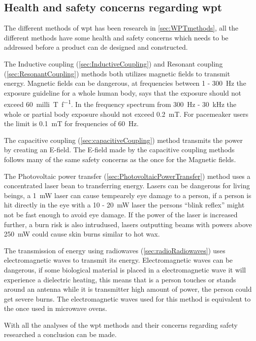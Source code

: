 \subsection{Health and safety concerns regarding \gls{wpt}}

The different methods of \gls{wpt} has been research in \autoref{sec:WPTmethods}, all the different methods have some health and safety concerns which needs to be addressed before a product can de designed and constructed. 

The Inductive coupling (\autoref{sec:InductiveCoupling}) and Resonant coupling (\autoref{sec:ResonantCoupling}) methods both utilizes magnetic fields to transmit energy. Magnetic fields can be dangerous, at frequencies between 1 - \SI{300}{\hertz} the exposure guideline for a whole human body, says that the exposure should not exceed \SI{60}{milli\tesla\per f}. In the frequency spectrum from \SI{300}{\hertz} - \SI{30}{\kilo\hertz} the whole or partial body exposure should not exceed \SI{0.2}{\milli\tesla}. For pacemeaker users the limit is \SI{0.1}{\milli\tesla} for frequencies of \SI{60}{\hertz}.  \cite{web:MagneticFieldSafty} 

The capacitive coupling (\autoref{sec:capacitiveCoupling}) method transmits the power by creating an E-field. The E-field made by the capacitive coupling methods follows many of the same safety concerns as the once for the Magnetic fields. 

The Photovoltaic power transfer (\autoref{sec:PhotovoltaicPowerTransfer}) method uses a concentrated laser bean to transferring energy. Lasers can be dangerous for living beings, a \SI{1}{\milli\watt} laser can cause tempearely eye damage to a person, if a person is hit directly in the eye with a 10 - \SI{20}{\milli\watt} laser the persons “blink reflex” might not be fast enough to avoid eye damage. If the power of the laser is increased further, a burn risk is also intrudused, lasers outputting beams with powers above \SI{250}{\milli\watt} could cause skin burns similar to hot wax. \cite{web:LaserSafty}

The transmission of energy using radiowaves (\autoref{sec:radioRadiowaves}) uses electromagnetic waves to transmit its energy. Electromagnetic waves can be dangerous, if some biological material is placed in a electromagnetic wave it will experience a dielectric heating, this means that is a person touches or stands around an antenna while it is transmitter high amount of power, the person could get severe burns. The electromagnetic waves used for this method is equivalent to the once used in microwave ovens. \cite{web:RadioWaveSafty}

With all the analyses of the \gls{wpt} methods and their concerns regarding safety researched a conclusion can be made. 
